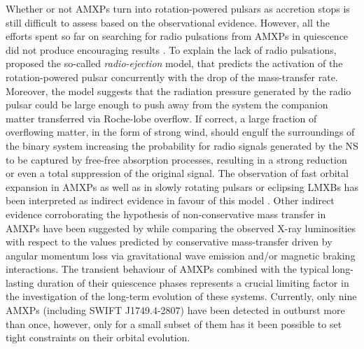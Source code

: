 \documentclass[fleqn,usenatbib]{mnras}
\newcommand{\swiftj}{SWIFT J1749.4-2807}
\begin{document}
Whether or not AMXPs turn into rotation-powered pulsars as accretion stops is still difficult to assess based on the observational evidence. However, all the efforts spent so far on searching for radio pulsations from AMXPs in quiescence did not produce encouraging results \citep[see e.g.,][]{Burgay:2003va,Patruno:2017ug,Sanna:2018td}. To explain the lack of radio pulsations, \citet{Burderi:2001wp} proposed the so-called \textit{radio-ejection} model, that predicts the activation of the rotation-powered pulsar concurrently with the drop of the mass-transfer rate. Moreover, the model suggests that the radiation pressure generated by the radio pulsar could be large enough to push away from the system the companion matter transferred via Roche-lobe overflow. If correct, a large fraction of overflowing matter, in the form of strong wind, should engulf the surroundings of the binary system increasing the probability for radio signals generated by the NS to be captured by free-free absorption processes, resulting in a strong reduction or even a total suppression of the original signal. The observation of fast orbital expansion in AMXPs \citep[see e.g.,][]{di-Salvo:2008uu,Burderi:2009td,Sanna:2016ty,Sanna:2017vj} as well as in slowly rotating pulsars or eclipsing LMXBs \citep[see e.g.,][]{Burderi:2010tk,Mazzola:2019wo,Iaria:2018tq} has been interpreted as indirect evidence in favour of this model \citep[however, see e.g.,][for alternative explanations]{Hartman:2008uj,Patruno:2012tw,Patruno:2017ug}. Other indirect evidence corroborating the hypothesis of non-conservative mass transfer in AMXPs have been suggested by \citet{Marino:2019vq} while comparing the observed X-ray luminosities with respect to the values predicted by conservative mass-transfer driven by angular momentum loss via gravitational wave emission and/or magnetic braking interactions. 
The transient behaviour of AMXPs combined with the typical long-lasting duration of their quiescence phases represents a crucial limiting factor in the investigation of the long-term evolution of these systems. Currently, only nine AMXPs (including \swiftj{}) have been detected in outburst more than once, however, only for a small subset of them has it been possible to set tight constraints on their orbital evolution.
\end{document}
